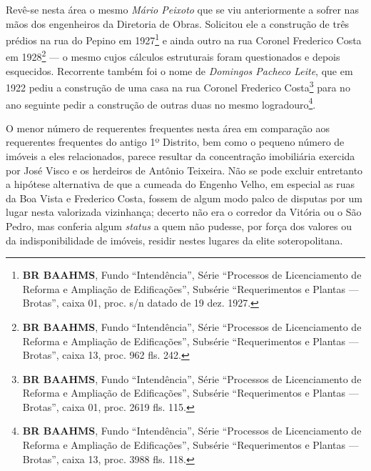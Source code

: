 Revê-se nesta área o mesmo \textit{Mário Peixoto} que se viu anteriormente a sofrer nas mãos dos engenheiros da Diretoria de Obras. Solicitou ele a construção de três prédios na rua do Pepino em 1927\footnote{\textbf{BR BAAHMS}, Fundo ``Intendência'', Série ``Processos de Licenciamento de Reforma e Ampliação de Edificações'', Subsérie ``Requerimentos e Plantas --- Brotas'', caixa 01, proc. s/n datado de 19 dez. 1927.} e ainda outro na rua Coronel Frederico Costa em 1928\footnote{\textbf{BR BAAHMS}, Fundo ``Intendência'', Série ``Processos de Licenciamento de Reforma e Ampliação de Edificações'', Subsérie ``Requerimentos e Plantas --- Brotas'', caixa 13, proc. 962 fls. 242.} --- o mesmo cujos cálculos estruturais foram questionados e depois esquecidos. Recorrente também foi o nome de \textit{Domingos Pacheco Leite}, que em 1922 pediu a construção de uma casa na rua Coronel Frederico Costa\footnote{\textbf{BR BAAHMS}, Fundo ``Intendência'', Série ``Processos de Licenciamento de Reforma e Ampliação de Edificações'', Subsérie ``Requerimentos e Plantas --- Brotas'', caixa 01, proc. 2619 fls. 115.} para no ano seguinte pedir a construção de outras duas no mesmo logradouro\footnote{\textbf{BR BAAHMS}, Fundo ``Intendência'', Série ``Processos de Licenciamento de Reforma e Ampliação de Edificações'', Subsérie ``Requerimentos e Plantas --- Brotas'', caixa 13, proc. 3988 fls. 118.}.

O menor número de requerentes frequentes nesta área em comparação aos requerentes frequentes do antigo 1º Distrito, bem como o pequeno número de imóveis a eles relacionados, parece resultar da concentração imobiliária exercida por José Visco e os herdeiros de Antônio Teixeira. Não se pode excluir entretanto a hipótese alternativa de que a cumeada do Engenho Velho, em especial as ruas da Boa Vista e Frederico Costa, fossem de algum modo palco de disputas por um lugar nesta valorizada vizinhança; decerto não era o corredor da Vitória ou o São Pedro, mas conferia algum \textit{status} a quem não pudesse, por força dos valores ou da indisponibilidade de imóveis, residir nestes lugares da elite soteropolitana. 


